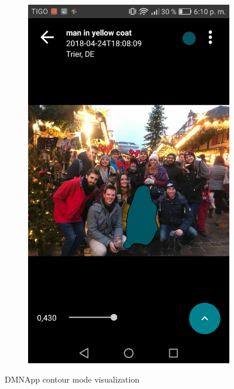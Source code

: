\begin{figure}[!htbp]
\begin{multicols}{2}
    \begin{subfigure}[b]{\columnwidth}
            \centering
            \includegraphics[width=\textwidth]{./figures/dmn_app/views/11.png}
    \label{subfig:contour_mode}
    \end{subfigure}
    \end{multicols}
    \caption{DMNApp contour mode visualization}
    \label{Fig:Vis_Heat}
\end{figure}

